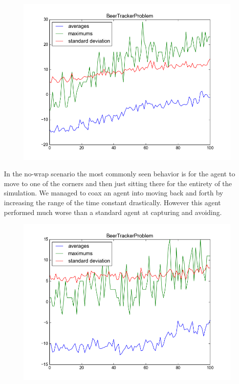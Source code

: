 \documentclass[twoside]{article}
\begin{document}
\begin{multicols}{2}
    \begin{figure}[H]
        \centering
        \includegraphics[width=\linewidth]{images/i_like_dis_grap}
        \caption{}
        \label{standard}
    \end{figure}


    In the no-wrap scenario the most commonly seen behavior is for the agent to move to one of the corners and then just sitting there for the entirety of the simulation.
We managed to coax an agent into moving back and forth by increasing the range of the time constant drastically.
However this agent performed much worse than a standard agent at capturing and avoiding.

    \begin{figure}[H]
        \centering
        \includegraphics[width=\linewidth]{images/nowrap_highT}
        \caption{}
        \label{nowrap}
    \end{figure}


\end{multicols}
\end{document}
